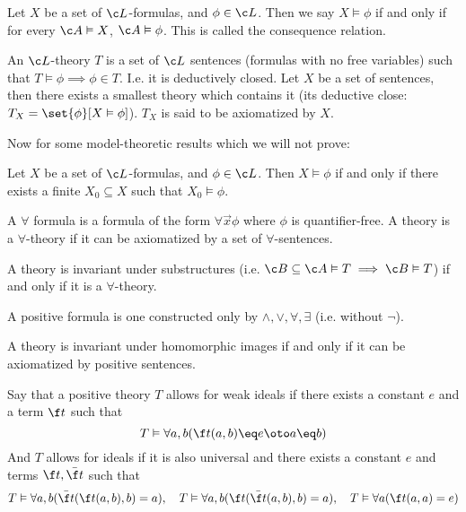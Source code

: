 \bdefn

    Let $X$ be a set of $\c L$-formulas, and $\phi\in\c L$.
    Then we say $X\vDash\phi$ if and only if for every $\c A\vDash X$, $\c A\vDash\phi$.
    This is called the {\emphcolor consequence relation}.

\edefn

\bdefn

    An $\c L$-theory $T$ is a set of $\c L$ sentences (formulas with no free variables) such that $T\vDash\phi\implies\phi\in T$.
    I.e. it is deductively closed.
    Let $X$ be a set of sentences, then there exists a smallest theory which contains it (its deductive close: $T_X=\set{\phi}[X\vDash\phi]$).
    $T_X$ is said to be {\emphcolor axiomatized} by $X$.

\edefn

Now for some model-theoretic results which we will not prove:

\bthrm[title=The Compactness Theorem]

    Let $X$ be a set of $\c L$-formulas, and $\phi\in\c L$.
    Then $X\vDash\phi$ if and only if there exists a finite $X_0\subseteq X$ such that $X_0\vDash\phi$.

\ethrm

\bdefn

    A {\emphcolor $\forall$ formula} is a formula of the form $\forall\vec x\phi$ where $\phi$ is quantifier-free.
    A theory is a $\forall$-theory if it can be axiomatized by a set of $\forall$-sentences.

\edefn

\bthrm

    A theory is invariant under substructures (i.e. $\c B\subseteq\c A\vDash T\implies\c B\vDash T$) if and only if it is a $\forall$-theory.

\ethrm

\bdefn

    A {\emphcolor positive formula} is one constructed only by $\land,\lor,\forall,\exists$ (i.e. without $\neg$).

\edefn

\bthrm

    A theory is invariant under homomorphic images if and only if it can be axiomatized by positive sentences.

\ethrm

\bdefn

    Say that a positive theory $T$ {\emphcolor allows for weak ideals} if there exists a constant $e$ and a term $\f t$ such that
    $$ T\vDash\forall a,b(\f t(a,b)\eq e\oto a\eq b) $$
    And $T$ {\emphcolor allows for ideals} if it is also universal and there exists a constant $e$ and terms $\f t,\bar{\f t}$ such that
    $$ T\vDash\forall a,b(\bar{\f t}(\f t(a,b),b)=a),\quad T\vDash\forall a,b(\f t(\bar{\f t}(a,b),b)=a),\quad T\vDash\forall a(\f t(a,a)=e) $$

